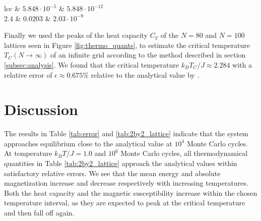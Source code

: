 \documentclass[twocolumn]{aastex62}
\begin{document}
\begin{deluxetable}{lcc}
	 & $5.848\cdot 10^{-5}$ & $5.848\cdot 10^{-12}$ \\
	2.4 & $0.0203$ & $2.03\cdot 10^{-9}$	
	\enddata
\end{deluxetable}
Finally we used the peaks of the heat capacity $C_V$ of the $N = 80$ and $N =
100$ lattices seen in Figure \ref{fig:thermo_quants}, to estimate the critical
temperature $T_C(N\to\infty)$ of an infinite grid according to the method
described in section \ref{subsec:analysis}. We found that the critical
temperature $k_BT_C / J \approx 2.284$ with a relative error of $\epsilon
\approx 0.675\%$ relative to the analytical value by \cite{onsager:1944}.

\section{Discussion} \label{sec:discussion}
The results in Table \ref{tab:error} and \ref{tab:2by2_lattice} indicate that
the system approaches equilibrium close to the analytical value at $10^4$ Monte
Carlo cycles. At temperature $k_BT/J=1.0$ and $10^6$ Monte Carlo cycles, all
thermodynamical quantities in Table \ref{tab:2by2_lattice} approach the
analytical values within satisfactory relative errors. We see that the
mean energy and absolute magnetization increase and decrease respectively with
increasing temperatures. Both the heat capacity and the magnetic susceptibility
increase within the chosen temperature interval, as they are expected to peak at
the critical temperature and then fall off again.
\end{document}
